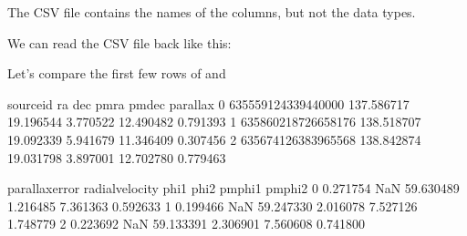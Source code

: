 \documentclass[letterpaper,10pt,english]{sphinxmanual}
\begin{document}
The CSV file contains the names of the columns, but not the data types.

We can read the CSV file back like this:

\begin{sphinxVerbatim}[commandchars=\\\{\}]
  
\end{sphinxVerbatim}

Let’s compare the first few rows of  and 

\begin{sphinxVerbatim}[commandchars=\\\{\}]
\end{sphinxVerbatim}

\begin{sphinxVerbatim}[commandchars=\\\{\}]
            source\PYGZus{}id          ra        dec      pmra      pmdec  parallax  \PYGZbs{}
0  635559124339440000  137.586717  19.196544 \PYGZhy{}3.770522 \PYGZhy{}12.490482  0.791393   
1  635860218726658176  138.518707  19.092339 \PYGZhy{}5.941679 \PYGZhy{}11.346409  0.307456   
2  635674126383965568  138.842874  19.031798 \PYGZhy{}3.897001 \PYGZhy{}12.702780  0.779463   

   parallax\PYGZus{}error  radial\PYGZus{}velocity       phi1      phi2   pm\PYGZus{}phi1   pm\PYGZus{}phi2  
0        0.271754              NaN \PYGZhy{}59.630489 \PYGZhy{}1.216485 \PYGZhy{}7.361363 \PYGZhy{}0.592633  
1        0.199466              NaN \PYGZhy{}59.247330 \PYGZhy{}2.016078 \PYGZhy{}7.527126  1.748779  
2        0.223692              NaN \PYGZhy{}59.133391 \PYGZhy{}2.306901 \PYGZhy{}7.560608 \PYGZhy{}0.741800  
\end{sphinxVerbatim}

\begin{sphinxVerbatim}[commandchars=\\\{\}]
\end{sphinxVerbatim}
\end{document}
